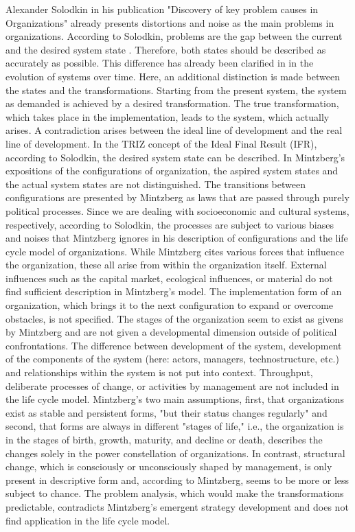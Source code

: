 \documentclass[a4paper,12pt]{article}
\begin{document}
Alexander Solodkin in his publication "Discovery of key problem causes in
Organizations" already presents distortions and noise as the main problems in
organizations. According to Solodkin, problems are the gap between the current
and the desired system state \cite{solodkin}. Therefore, both states should be
described as accurately as possible. This difference has already been
clarified in \cite{graebe:2021} in the evolution of systems over time. Here,
an additional distinction is made between the states and the
transformations. Starting from the present system, the system as demanded is
achieved by a desired transformation. The true transformation, which takes
place in the implementation, leads to the system, which actually arises. A
contradiction arises between the ideal line of development and the real line
of development. In the TRIZ concept of the Ideal Final Result (IFR), according
to Solodkin, the desired system state can be described. In Mintzberg's
expositions of the configurations of organization, the aspired system states
and the actual system states are not distinguished. The transitions between
configurations are presented by Mintzberg as laws that are passed through
purely political processes. Since we are dealing with socioeconomic and
cultural systems, respectively, according to Solodkin, the processes are
subject to various biases and noises that Mintzberg ignores in his description
of configurations and the life cycle model of organizations. While Mintzberg
cites various forces that influence the organization, these all arise from
within the organization itself. External influences such as the capital
market, ecological influences, or material do not find sufficient description
in Mintzberg's model. The implementation form of an organization, which brings
it to the next configuration to expand or overcome obstacles, is not
specified. The stages of the organization seem to exist as givens by Mintzberg
and are not given a developmental dimension outside of political
confrontations. The difference between development of the system, development
of the components of the system (here: actors, managers, technostructure,
etc.) and relationships within the system is not put into context. Throughput,
deliberate processes of change, or activities by management are not included
in the life cycle model. Mintzberg's two main assumptions, first, that
organizations exist as stable and persistent forms, "but their status changes
regularly" \cite[p. 287]{Mintzberg} and second, that forms are always in
different "stages of life," i.e., the organization is in the stages of birth,
growth, maturity, and decline or death, describes the changes solely in the
power constellation of organizations. In contrast, structural change, which is
consciously or unconsciously shaped by management, is only present in
descriptive form and, according to Mintzberg, seems to be more or less subject
to chance. The problem analysis, which would make the transformations
predictable, contradicts Mintzberg's emergent strategy development and does
not find application in the life cycle model.
\end{document}

